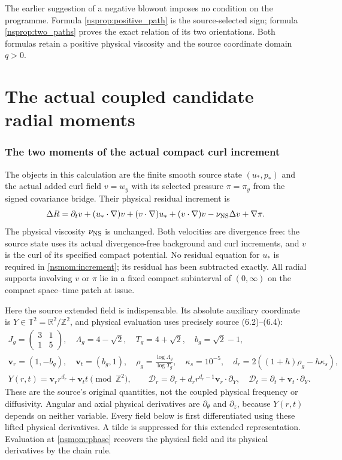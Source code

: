 \documentclass[11pt]{article}
\begin{document}
The earlier suggestion of a negative blowout imposes no condition on
the programme. Formula \eqref{nsprop:positive_path} is the source-selected
sign; formula \eqref{nsprop:two_paths} proves the exact relation of its
two orientations. Both formulas retain a positive physical viscosity
and the source coordinate domain $q>0$.

\clearpage\part{The actual coupled candidate radial moments}
\section{The two moments of the actual compact curl increment}
\label{nsmom:setup}
The objects in this calculation are the finite smooth source state
$(u_*,p_*)$ and the actual added curl field $v=w_y$ with its selected
pressure $\pi=\pi_y$ from the signed covariance bridge. Their physical
residual increment is
\begin{equation}
 \Delta R=\partial_t v+(u_*\cdot\nabla)v+(v\cdot\nabla)u_*
 +(v\cdot\nabla)v-\nu_{\rm NS}\Delta v+\nabla\pi .
 \label{nsmom:increment}
\end{equation}
The physical viscosity $\nu_{\rm NS}$ is unchanged. Both velocities are
divergence free: the source state uses its actual divergence-free
background and curl increments, and $v$ is the curl of its specified
compact potential. No residual equation for $u_*$ is required in
\eqref{nsmom:increment}; its residual has been subtracted exactly.
All radial supports involving $v$ or $\pi$ lie in a fixed compact
subinterval of $(0,\infty)$ on the compact space--time patch at issue.

Here the source extended field is indispensable. Its absolute auxiliary
coordinate is $Y\in\mathbb T^2=\mathbb R^2/\mathbb Z^2$, and physical
evaluation uses precisely source (6.2)--(6.4):
\begin{gather}
 J_g=\begin{pmatrix}3&1\\1&5\end{pmatrix},\quad
 \Lambda_g=4-\sqrt2,\quad T_g=4+\sqrt2,\quad b_g=\sqrt2-1,\nonumber\\
 \mathbf v_r=(1,-b_g),\quad\mathbf v_t=(b_g,1),\quad
 \rho_g=\frac{\log\Lambda_g}{\log T_g},\quad
 \kappa_s=10^{-5},\quad d_r=2((1+h)\rho_g-h\kappa_s),\nonumber\\
 Y(r,t)=\mathbf v_r r^{d_r}+\mathbf v_t t\pmod{\mathbb Z^2},\qquad
 \mathscr D_r=\partial_r+d_r r^{d_r-1}\mathbf v_r\cdot\partial_Y,
 \quad\mathscr D_t=\partial_t+\mathbf v_t\cdot\partial_Y.
 \label{nsmom:phase}
\end{gather}
These are the source's original quantities, not the coupled physical
frequency or diffusivity. Angular and axial physical derivatives are
$\partial_\theta$ and $\partial_z$, because $Y(r,t)$ depends on neither
variable. Every field below is first differentiated using these lifted
physical derivatives. A tilde is suppressed for this extended
representation. Evaluation at \eqref{nsmom:phase} recovers the physical
field and its physical derivatives by the chain rule.
\end{document}

